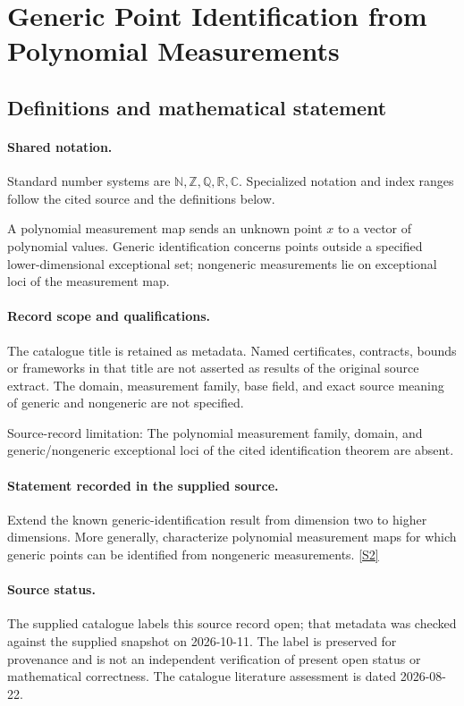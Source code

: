\documentclass[11pt]{article}
\newcommand{\sref}[2]{\hyperlink{source:#1:#2}{[S#2]}}
\begin{document}
\section{Generic Point Identification from Polynomial Measurements}\label{statement}

\subsection{Definitions and mathematical statement}

\paragraph{Shared notation.}Standard number systems are $\mathbb N,\mathbb Z,\mathbb Q,\mathbb R,\mathbb C$. Specialized notation and index ranges follow the cited source and the definitions below.


A polynomial measurement map sends an unknown point $x$ to a vector of polynomial values. Generic identification concerns points outside a specified lower-dimensional exceptional set; nongeneric measurements lie on exceptional loci of the measurement map.
\paragraph{Record scope and qualifications.}
The catalogue title is retained as metadata. Named certificates, contracts, bounds or frameworks in that title are not asserted as results of the original source extract.
The domain, measurement family, base field, and exact source meaning of generic and nongeneric are not specified.

Source-record limitation: The polynomial measurement family, domain, and generic/nongeneric exceptional loci of the cited identification theorem are absent.
\paragraph{Statement recorded in the supplied source.}
Extend the known generic-identification result from dimension two to higher dimensions. More generally, characterize polynomial measurement maps for which generic points can be identified from nongeneric measurements. \sref{statement}{2}
\paragraph{Source status.}
The supplied catalogue labels this source record open; that metadata was checked against the supplied snapshot on 2026-10-11. The label is preserved for provenance and is not an independent verification of present open status or mathematical correctness. The catalogue literature assessment is dated 2026-08-22.
\end{document}
